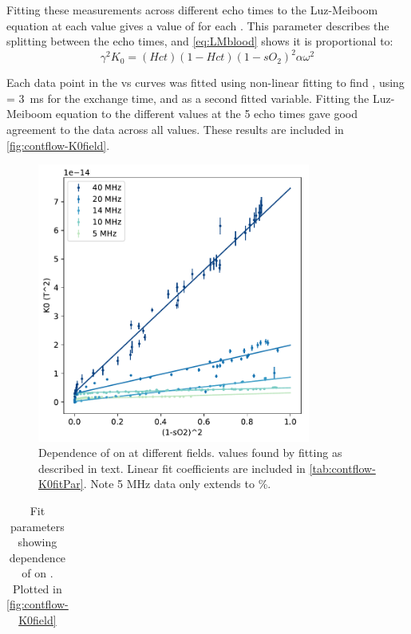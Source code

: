 Fitting these \Rtwo measurements across different echo times to the Luz-Meiboom equation at each \SOtwo value gives a value of \Kzero for each \SOtwo.
This parameter describes the splitting between the echo times, and \autoref{eq:LMblood} shows it is proportional to:
\begin{displaymath}
\gamma^2 K_0 = (Hct)(1-Hct)(1-sO_2)^2 \alpha \omega^2
\end{displaymath}

Each data point in the \Rtwo vs \SOtwo curves was fitted using non-linear fitting to find \Kzero, using  \Texc =  \SI{3}{ms} for the exchange time, and \TtwoO as a second fitted variable.
Fitting the Luz-Meiboom equation to the different \Rtwo values at the 5 echo times gave good agreement to the data across all \SOtwo values.
These results are included in \autoref{fig:contflow-K0field}.
\begin{figure}[t]
\centering
\includegraphics[width=0.8\textwidth]{figures/contflow/K0field.pdf}
\caption[Relationship between \Kzero on \SOtwo at different fields]{Dependence of \Kzero on \SOtwo at different fields. \Kzero values found by fitting as described in text. Linear fit coefficients are included in \autoref{tab:contflow-K0fitPar}. Note 5 MHz data only extends to \%.}
\label{fig:contflow-K0field}
\end{figure}

\begin{table}[b]

\centering
\begin{tabular}{|c|cc|c|}
\hline

\hline
\end{tabular}
\caption[Fit parameters for dependence of \Kzero on \SOtwo]{Fit parameters showing dependence of \Kzero on \SOtwo. Plotted in \autoref{fig:contflow-K0field}}
\label{tab:contflow-K0fitPar}
\end{table}

